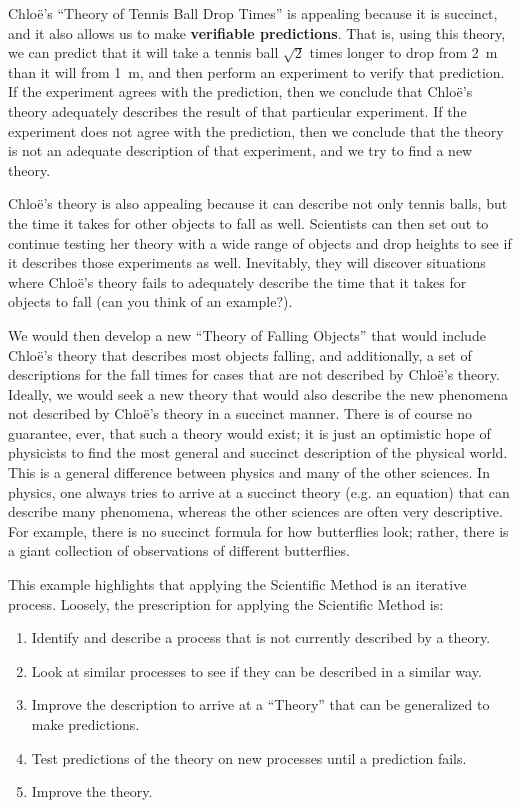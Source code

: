 Chlo\"e's ``Theory of Tennis Ball Drop Times'' is appealing because it is succinct, and it also allows us to make \textbf{verifiable predictions}. That is, using this theory, we can predict that it will take a tennis ball $\sqrt 2$ times longer to drop from \SI{2}{\meter} than it will from \SI{1}{\meter}, and then perform an experiment to verify that prediction. If the experiment agrees with the prediction, then we conclude that Chlo\"e's theory adequately describes the result of that particular experiment. If the experiment does not agree with the prediction, then we conclude that the theory is not an adequate description of that experiment, and we try to find a new theory.

Chlo\"e's theory is also appealing because it can describe not only tennis balls, but the time it takes for other objects to fall as well. Scientists can then set out to continue testing her theory with a wide range of objects and drop heights to see if it describes those experiments as well. Inevitably, they will discover situations where Chlo\"e's theory fails to adequately describe the time that it takes for objects to fall (can you think of an example?).

We would then develop a new ``Theory of Falling Objects'' that would include Chlo\"e's theory that describes most objects falling, and additionally, a set of descriptions for the fall times for cases that are not described by Chlo\"e's theory. Ideally, we would seek a new theory that would also describe the new phenomena not described by Chlo\"e's theory in a succinct manner. There is of course no guarantee, ever, that such a theory would exist; it is just an optimistic hope of physicists to find the most general and succinct description of the physical world. This is a general difference between physics and many of the other sciences. In physics, one always tries to arrive at a succinct theory (e.g. an equation) that can describe many phenomena, whereas the other sciences are often very descriptive. For example, there is no succinct formula for how butterflies look; rather, there is a giant collection of observations of different butterflies.

This example highlights that applying the Scientific Method is an iterative process. Loosely, the prescription for applying the Scientific Method is:
\begin{enumerate}
\item Identify and describe a process that is not currently described by a theory.
\item Look at similar processes to see if they can be described in a similar way.
\item Improve the description to arrive at a ``Theory'' that can be generalized to make predictions.
\item Test predictions of the theory on new processes until a prediction fails.
\item Improve the theory.
\end{enumerate}

